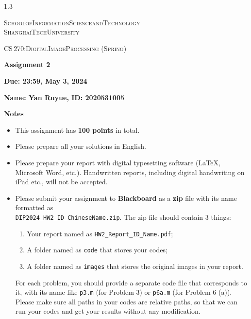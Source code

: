 \documentclass[A4paper, 11pt]{article}
\newcommand{\<}{\,\langle\,}
\renewcommand{\>}{\,\rangle}
\newcommand{\0}{\mathbf{0}}
\newcommand{\1}{\mathbf{1}}
\newcommand{\typeset}{
    \setlength{\parindent}{0pt}
    \setlength{\parskip}{1ex}
    \setlength{\abovedisplayskip}{1ex}
    \setlength{\belowdisplayskip}{1ex}
}
\begin{document}
\begin{spacing}{1.3}

\typeset

\textsc{\large{School\;of\;Information\;Science\;and\;Technology\\[2pt] ShanghaiTech\;University}}

\vspace*{5ex}

\textsc{\large{CS\,270:\;Digital\;Image\;Processing (Spring)}}

\vspace*{2.5ex} \textbf{\huge{Assignment 2}}

\vspace*{1.5ex} \textbf{\large{Due: 23:59, May 3, 2024}}

\vspace*{1.5ex} \textbf{\large{Name: Yan Ruyue, ID: 2020531005}}

\vspace*{5ex}

\textbf{\large{Notes}}

\begin{itemize} \setlength{\parskip}{0.5ex} \vspace*{-1ex} 
    \item This assignment has \textbf{100 points} in total.
    \item Please prepare all your solutions in English.
    \item Please prepare your report with digital typesetting software (LaTeX, Microsoft Word, etc.). Handwritten reports, including digital handwriting on iPad etc., will not be accepted.
    \item Please submit your assignment to \textbf{Blackboard} as a \textbf{zip} file with its name formatted as\\ \texttt{DIP2024\_HW2\_ID\_ChineseName.zip}. The zip file should contain 3 things:
    \begin{enumerate}
        \item Your report named as \texttt{HW2\_Report\_ID\_Name.pdf};
        \item A folder named as \texttt{code} that stores your codes;
        \item A folder named as \texttt{images} that stores the original images in your report.
    \end{enumerate}
    For each problem, you should provide a separate code file that corresponds to it, with its name like \texttt{p3.m} (for Problem 3) or \texttt{p6a.m} (for Problem 6 (a)). Please make sure all paths in your codes are relative paths, so that we can run your codes and get your results without any modification.
\end{itemize}


\end{spacing}
\end{document}
